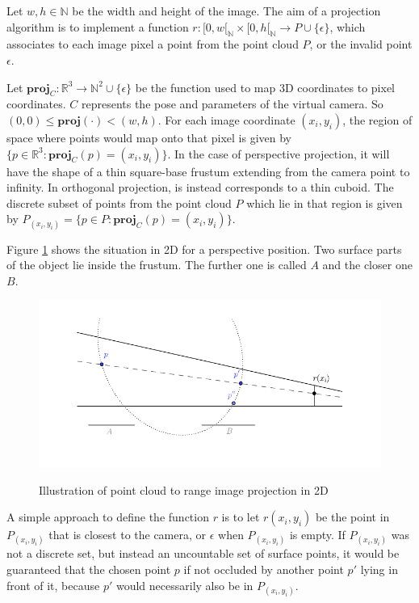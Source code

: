 Let $w, h \in \mathbb{N}$ be the width and height of the image. The aim of a projection algorithm is to implement a function $r : [0, w[_{\mathbb{N}} \times [0, h[_{\mathbb{N}} \rightarrow P \cup \{ \epsilon \}$, which associates to each image pixel a point from the point cloud $P$, or the invalid point $\epsilon$. 

Let $\mathbf{proj}_{C} : \mathbb{R}^3 \rightarrow \mathbb{N}^2 \cup \{ \epsilon \}$ be the function used to map 3D coordinates to pixel coordinates. $C$ represents the pose and parameters of the virtual camera. So $(0, 0) \leq \mathbf{proj}(\cdot) < (w, h)$. For each image coordinate $(x_i, y_i)$, the region of space where points would map onto that pixel is given by $\{ p \in \mathbb{R}^3 : \mathbf{proj}_{C}(p) = (x_i, y_i) \}$. In the case of perspective projection, it will have the shape of a thin square-base frustum extending from the camera point to infinity. In orthogonal projection, is instead corresponds to a thin cuboid. The discrete subset of points from the point cloud $P$ which lie in that region is given by $P_{(x_i,y_i)} = \{ p \in P : \mathbf{proj}_{C}(p) = (x_i, y_i) \}$.

Figure \ref{fig:pp_projection} shows the situation in 2D for a perspective position. Two surface parts of the object lie inside the frustum. The further one is called $A$ and the closer one $B$.

\begin{figure}[h]
\center
\includegraphics[width=.8\textwidth]{fig/pp_projection.pdf}
\label{fig:pp_projection}
\caption{Illustration of point cloud to range image projection in 2D}
\end{figure}

A simple approach to define the function $r$ is to let $r(x_i, y_i)$ be the point in $P_{(x_i,y_i)}$ that is closest to the camera, or $\epsilon$ when $P_{(x_i,y_i)}$ is empty. If $P_{(x_i,y_i)}$ was not a discrete set, but instead an uncountable set of surface points, it would be guaranteed that the chosen point $p$ if not occluded by another point $p'$ lying in front of it, because $p'$ would necessarily also be in $P_{(x_i,y_i)}$.

